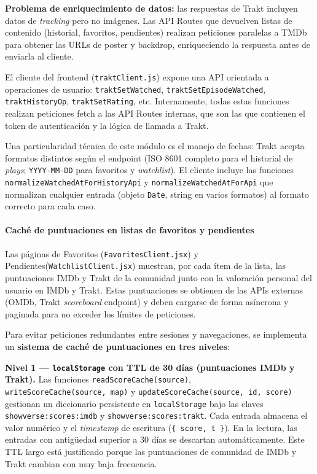 \documentclass[
]{article}
\begin{document}
\textbf{Problema de enriquecimiento de datos:} las respuestas de Trakt
incluyen datos de \emph{tracking} pero no imágenes. Las API Routes que
devuelven listas de contenido (historial, favoritos, pendientes)
realizan peticiones paralelas a TMDb para obtener las URLs de poster y
backdrop, enriqueciendo la respuesta antes de enviarla al cliente.

El cliente del frontend (\texttt{traktClient.js}) expone una API
orientada a operaciones de usuario: \texttt{traktSetWatched},
\texttt{traktSetEpisodeWatched}, \texttt{traktHistoryOp},
\texttt{traktSetRating}, etc. Internamente, todas estas funciones
realizan peticiones fetch a las API Routes internas, que son las que
contienen el token de autenticación y la lógica de llamada a Trakt.

Una particularidad técnica de este módulo es el manejo de fechas: Trakt
acepta formatos distintos según el endpoint (ISO 8601 completo para el
historial de \emph{plays}; \texttt{YYYY-MM-DD} para favoritos y
\emph{watchlist}). El cliente incluye las funciones
\texttt{normalizeWatchedAtForHistoryApi} y
\texttt{normalizeWatchedAtForApi} que normalizan cualquier entrada
(objeto \texttt{Date}, string en varios formatos) al formato correcto
para cada caso.

\hypertarget{cachuxe9-de-puntuaciones-en-listas-de-favoritos-y-pendientes}{%
\paragraph{Caché de puntuaciones en listas de favoritos y
pendientes}\label{cachuxe9-de-puntuaciones-en-listas-de-favoritos-y-pendientes}}

Las páginas de Favoritos (\texttt{FavoritesClient.jsx}) y
Pendientes(\texttt{WatchlistClient.jsx}) muestran, por cada ítem de la
lista, las puntuaciones IMDb y Trakt de la comunidad junto con la
valoración personal del usuario en IMDb y Trakt. Estas puntuaciones se
obtienen de las APIs externas (OMDb, Trakt \emph{scoreboard} endpoint) y
deben cargarse de forma asíncrona y paginada para no exceder los límites
de peticiones.

Para evitar peticiones redundantes entre sesiones y navegaciones, se
implementa un \textbf{sistema de caché de puntuaciones en tres niveles}:

\textbf{Nivel 1 --- \texttt{localStorage} con TTL de 30 días
(puntuaciones IMDb y Trakt).} Las funciones
\texttt{readScoreCache(source)}, \texttt{writeScoreCache(source,\ map)}
y \texttt{updateScoreCache(source,\ id,\ score)} gestionan un
diccionario persistente en \texttt{localStorage} bajo las claves
\texttt{showverse:scores:imdb} y \texttt{showverse:scores:trakt}. Cada
entrada almacena el valor numérico y el \emph{timestamp} de escritura
(\texttt{\{\ score,\ t\ \}}). En la lectura, las entradas con antigüedad
superior a 30 días se descartan automáticamente. Este TTL largo está
justificado porque las puntuaciones de comunidad de IMDb y Trakt cambian
con muy baja frecuencia.
\end{document}
